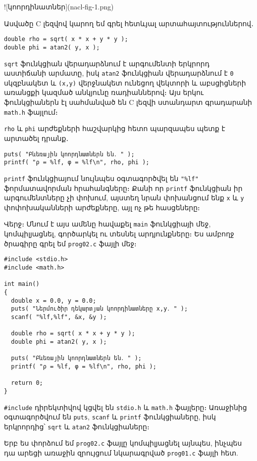 ![կոորդինատներ](nacl-fig-1.png)

Ասվածը C լեզվով կարող եմ գրել հետևյալ արտահայտություններով․

\begin{verbatim}
double rho = sqrt( x * x + y * y );
double phi = atan2( y, x );
\end{verbatim}

\texttt{sqrt} ֆունկցիան վերադարձնում է արգումենտի երկրորդ աստիճանի
արմատը, իսկ \texttt{atan2} ֆունկցիան վերադարձնում է \texttt{0} սկզբնակետ
և \texttt{(x,y)} վերջնակետ ունեցող վեկտորի և աբսցիցների առանցքի կազմած
անկյունը ռադիաններով։ Այս երկու ֆունկցիաներն էլ սահմանված են C լեզվի
ստանդարտ գրադարանի \texttt{math.h} ֆայլում։

\texttt{rho} և \texttt{phi} արժեքների հաշվարկից հետո պարզապես պետք է
արտածել դրանք․

\begin{verbatim}
puts( "Բևեռային կոորդնատներն են․ " );
printf( "ρ = %lf, φ = %lf\n", rho, phi );
\end{verbatim}

\texttt{printf} ֆունկցիայում նույնպես օգտագործվել են \texttt{"\%lf"}
ֆորմատավորման հրահանգները։ Քանի որ \texttt{printf} ֆունկցիան իր
արգումենտները չի փոխում, այստեղ նրան փոխանցում ենք \texttt{x} և
\texttt{y} փոփոխականների արժեքները, այլ ոչ թե հասցեները։

Վերջ։ Մնում է այս ամենը հավաքել \texttt{main} ֆունկցիայի մեջ,
կոմպիլյացնել, գործարկել ու տեսնել արդյունքները։ Ես ամբողջ ծրագիրը գրել
եմ \texttt{prog02.c} ֆայլի մեջ։

\begin{verbatim}
#include <stdio.h>
#include <math.h>

int main()
{
  double x = 0.0, y = 0.0;
  puts( "Ներմուծիր դեկարտյան կոորդինատները x,y․ " );
  scanf( "%lf,%lf", &x, &y );

  double rho = sqrt( x * x + y * y );
  double phi = atan2( y, x );

  puts( "Բևեռային կոորդնատներն են․ " );
  printf( "ρ = %lf, φ = %lf\n", rho, phi );

  return 0;
}
\end{verbatim}

\texttt{\#include} դիրեկտիվով կցվել են \texttt{stdio.h} և
\texttt{math.h} ֆայլերը։ Առաջինից օգտագործվում են \texttt{puts},
\texttt{scanf} և \texttt{printf} ֆունկցիաները, իսկ երկրորդից՝
\texttt{sqrt} և \texttt{atan2} ֆունկցիաները։

Երբ ես փորձում եմ \texttt{prog02.c} ֆայլը կոմպիլյացնել այնպես, ինչպես դա
արեցի առաջին զրույցում նկարագրված \texttt{prog01.c} ֆայլի հետ.


